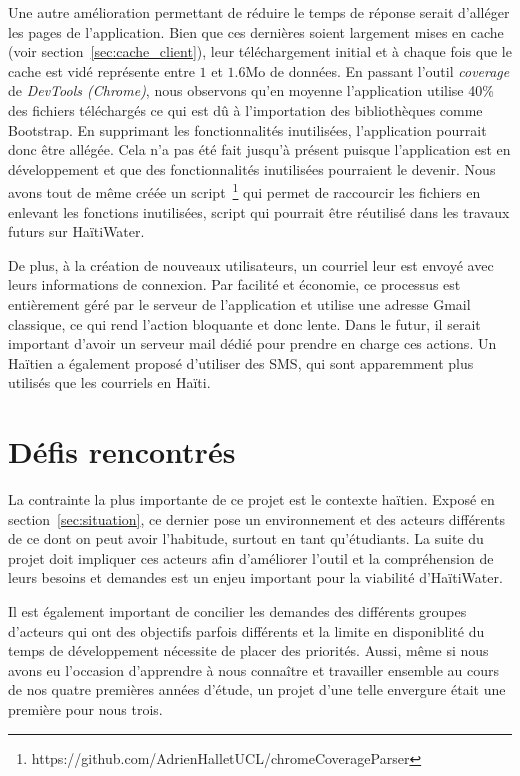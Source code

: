 \documentclass{EPL-master-thesis-covers-FR}
\begin{document}
			Une autre amélioration permettant de réduire le temps de réponse serait d'alléger les pages de l'application. Bien que ces dernières soient largement mises en cache (voir section~\ref{sec:cache_client}), leur téléchargement initial et à chaque fois que le cache est vidé représente entre $1$ et $1.6$Mo de données. En passant l'outil \emph{coverage} de \emph{DevTools (Chrome)}, nous observons qu'en moyenne l'application utilise 40\% des fichiers téléchargés ce qui est dû à l'importation des bibliothèques comme Bootstrap. En supprimant les fonctionnalités inutilisées, l'application pourrait donc être allégée. Cela n'a pas été fait jusqu'à présent puisque l'application est en développement et que des fonctionnalités inutilisées pourraient le devenir. Nous avons tout de même créée un script~\footnote{https://github.com/AdrienHalletUCL/chromeCoverageParser} qui permet de raccourcir les fichiers en enlevant les fonctions inutilisées, script qui pourrait être réutilisé dans les travaux futurs sur HaïtiWater.

			De plus, à la création de nouveaux utilisateurs, un courriel leur est envoyé avec leurs informations de connexion. Par facilité et économie, ce processus est entièrement géré par le serveur de l'application et utilise une adresse Gmail classique, ce qui rend l'action bloquante et donc lente. Dans le futur, il serait important d'avoir un serveur mail dédié pour prendre en charge ces actions. Un Haïtien a également proposé d'utiliser des SMS, qui sont apparemment plus utilisés que les courriels en Haïti.

		\section{Défis rencontrés}

			La contrainte la plus importante de ce projet est le contexte haïtien. Exposé en section~\ref{sec:situation}, ce dernier pose un environnement et des acteurs différents de ce dont on peut avoir l'habitude, surtout en tant qu'étudiants. La suite du projet doit impliquer ces acteurs afin d'améliorer l'outil et la compréhension de leurs besoins et demandes est un enjeu important pour la viabilité d'HaïtiWater.

			Il est également important de concilier les demandes des différents groupes d'acteurs qui ont des objectifs parfois différents et la limite en disponiblité du temps de développement nécessite de placer des priorités. Aussi, même si nous avons eu l'occasion d'apprendre à nous connaître et travailler ensemble au cours de nos quatre premières années d'étude, un projet d'une telle envergure était une première pour nous trois.
\end{document}
